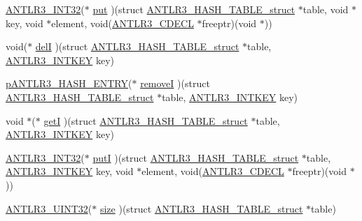 \begin{DoxyCompactItemize}
\item 
\hyperlink{antlr3defs_8h_a6faef5c4687f8eb633d2aefea93973ca}{A\-N\-T\-L\-R3\-\_\-\-I\-N\-T32}($\ast$ \hyperlink{struct_a_n_t_l_r3___h_a_s_h___t_a_b_l_e__struct_a4363561883625cf706e55bb15a716b80}{put} )(struct \hyperlink{struct_a_n_t_l_r3___h_a_s_h___t_a_b_l_e__struct}{A\-N\-T\-L\-R3\-\_\-\-H\-A\-S\-H\-\_\-\-T\-A\-B\-L\-E\-\_\-struct} $\ast$table, void $\ast$key, void $\ast$element, void(\hyperlink{antlr3defs_8h_a91c919dd260a95cc88a0cd9b5c0a11cc}{A\-N\-T\-L\-R3\-\_\-\-C\-D\-E\-C\-L} $\ast$freeptr)(void $\ast$))
\item 
void($\ast$ \hyperlink{struct_a_n_t_l_r3___h_a_s_h___t_a_b_l_e__struct_ade4f7f8ff2754fd61608f971f41ebfa0}{del\-I} )(struct \hyperlink{struct_a_n_t_l_r3___h_a_s_h___t_a_b_l_e__struct}{A\-N\-T\-L\-R3\-\_\-\-H\-A\-S\-H\-\_\-\-T\-A\-B\-L\-E\-\_\-struct} $\ast$table, \hyperlink{antlr3defs_8h_aa5533fd558adc28dc2af0039f52324a8}{A\-N\-T\-L\-R3\-\_\-\-I\-N\-T\-K\-E\-Y} key)
\item 
\hyperlink{antlr3interfaces_8h_a23202440c7441d8812a77e62318aafc9}{p\-A\-N\-T\-L\-R3\-\_\-\-H\-A\-S\-H\-\_\-\-E\-N\-T\-R\-Y}($\ast$ \hyperlink{struct_a_n_t_l_r3___h_a_s_h___t_a_b_l_e__struct_a72f8a4c1833aeb721321eab688a5feed}{remove\-I} )(struct \hyperlink{struct_a_n_t_l_r3___h_a_s_h___t_a_b_l_e__struct}{A\-N\-T\-L\-R3\-\_\-\-H\-A\-S\-H\-\_\-\-T\-A\-B\-L\-E\-\_\-struct} $\ast$table, \hyperlink{antlr3defs_8h_aa5533fd558adc28dc2af0039f52324a8}{A\-N\-T\-L\-R3\-\_\-\-I\-N\-T\-K\-E\-Y} key)
\item 
void $\ast$($\ast$ \hyperlink{struct_a_n_t_l_r3___h_a_s_h___t_a_b_l_e__struct_a69227961769097578f58029513e3ee7c}{get\-I} )(struct \hyperlink{struct_a_n_t_l_r3___h_a_s_h___t_a_b_l_e__struct}{A\-N\-T\-L\-R3\-\_\-\-H\-A\-S\-H\-\_\-\-T\-A\-B\-L\-E\-\_\-struct} $\ast$table, \hyperlink{antlr3defs_8h_aa5533fd558adc28dc2af0039f52324a8}{A\-N\-T\-L\-R3\-\_\-\-I\-N\-T\-K\-E\-Y} key)
\item 
\hyperlink{antlr3defs_8h_a6faef5c4687f8eb633d2aefea93973ca}{A\-N\-T\-L\-R3\-\_\-\-I\-N\-T32}($\ast$ \hyperlink{struct_a_n_t_l_r3___h_a_s_h___t_a_b_l_e__struct_a02775fc520b0fab70f981cb48fcf9cb0}{put\-I} )(struct \hyperlink{struct_a_n_t_l_r3___h_a_s_h___t_a_b_l_e__struct}{A\-N\-T\-L\-R3\-\_\-\-H\-A\-S\-H\-\_\-\-T\-A\-B\-L\-E\-\_\-struct} $\ast$table, \hyperlink{antlr3defs_8h_aa5533fd558adc28dc2af0039f52324a8}{A\-N\-T\-L\-R3\-\_\-\-I\-N\-T\-K\-E\-Y} key, void $\ast$element, void(\hyperlink{antlr3defs_8h_a91c919dd260a95cc88a0cd9b5c0a11cc}{A\-N\-T\-L\-R3\-\_\-\-C\-D\-E\-C\-L} $\ast$freeptr)(void $\ast$))
\item 
\hyperlink{antlr3defs_8h_ac41f744abd0fd25144b9eb9d11b1dfd1}{A\-N\-T\-L\-R3\-\_\-\-U\-I\-N\-T32}($\ast$ \hyperlink{struct_a_n_t_l_r3___h_a_s_h___t_a_b_l_e__struct_a62af9925961c7ffef5fdb3773405f67f}{size} )(struct \hyperlink{struct_a_n_t_l_r3___h_a_s_h___t_a_b_l_e__struct}{A\-N\-T\-L\-R3\-\_\-\-H\-A\-S\-H\-\_\-\-T\-A\-B\-L\-E\-\_\-struct} $\ast$table)
\end{DoxyCompactItemize}


